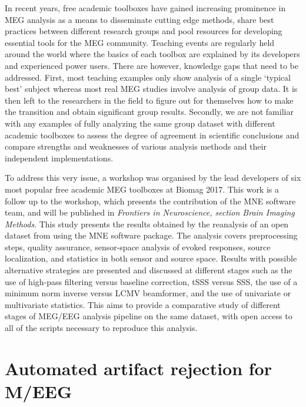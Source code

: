 In recent years, free academic toolboxes have gained increasing prominence in \ac{MEG} analysis as a means to disseminate cutting edge methods, share best practices between different research groups and pool resources for developing essential tools for the \ac{MEG} community. Teaching events are regularly held around the world where the basics of each toolbox are explained by its  developers and experienced power users. There are however, knowledge gaps that need to be addressed. First, most teaching examples only show analysis of a single ‘typical best’ subject whereas most real MEG studies involve analysis of group data. It is then left to the researchers in the field to figure out for themselves how to make the transition and obtain significant group results. Secondly, we are not familiar with any examples of fully analyzing the same group dataset with different academic toolboxes to assess the degree of agreement in scientific conclusions and compare strengths and weaknesses of various analysis methods and their independent implementations.

To address this very issue, a workshop was organised by the lead developers of six most popular free academic MEG toolboxes at Biomag 2017. This work is a follow up to the workshop, which presents the contribution of the MNE software team, and will be published in \emph{Frontiers in Neuroscience, section Brain Imaging Methods}. This study presents the results obtained by the reanalysis of an open dataset from \citet{wakeman2015multi} using the MNE software package. The analysis covers preprocessing steps, quality assurance, sensor-space analysis of evoked responses, source localization, and statistics in both sensor and source space. Results with possible alternative strategies are presented and discussed at different stages such as the use of high-pass filtering versus baseline correction, tSSS versus \ac{SSS}, the use of a minimum norm inverse versus \ac{LCMV} beamformer, and the use of univariate or multivariate statistics. This aims to provide a comparative study of different stages of \ac{MEG}/\ac{EEG} analysis pipeline on the same dataset, with open access to all of the scripts necessary to reproduce this analysis.

\clearpage

\section{Automated artifact rejection for M/EEG}

